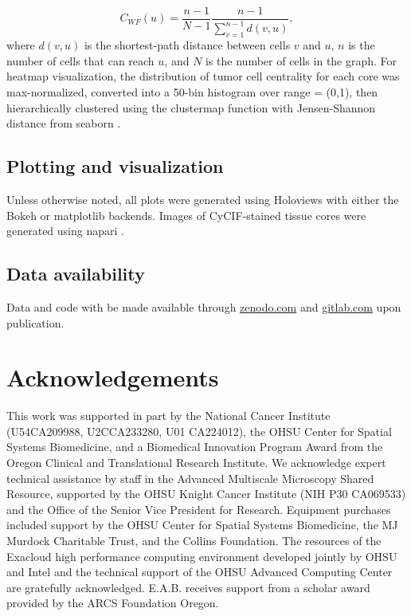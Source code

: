 \documentclass[preprint,review,3p,12pt]{elsarticle}
\begin{document}
\begin{equation}
\label{eq:cc}
C_{WF}(u) = \frac{n-1}{N-1} \frac{n - 1}{\sum_{v=1}^{n-1} d(v, u)},
\end{equation}
where $d(v,u)$ is the shortest-path distance between cells $v$ and $u$, $n$ is the number of cells that can reach $u$, and $N$ is the number of cells in the graph. For heatmap visualization, the distribution of tumor cell centrality for each core was max-normalized, converted into a 50-bin histogram over range = (0,1), then hierarchically clustered using the clustermap function with Jensen-Shannon distance from seaborn \cite{seaborn2020}.

\subsection{Plotting and visualization}
Unless otherwise noted, all plots were generated using Holoviews \cite{holoviews1_12_7} with either the Bokeh \cite{bokeh2020} or matplotlib \cite{mpl2007} backends. Images of CyCIF-stained tissue cores were generated using napari \cite{napari_0_3_0}.

\subsection{Data availability}
Data and code with be made available through \url{zenodo.com} and \url{gitlab.com} upon publication.

\section{Acknowledgements}
This work was supported in part by the National Cancer Institute (U54CA209988, U2CCA233280, U01 CA224012), the OHSU Center for Spatial Systems Biomedicine, and a Biomedical Innovation Program Award from the Oregon Clinical and Translational Research Institute. We acknowledge expert technical assistance by staff in the Advanced Multiscale Microscopy Shared Resource, supported by the OHSU Knight Cancer Institute (NIH P30 CA069533) and the Office of the Senior Vice President for Research. Equipment purchases included support by the OHSU Center for Spatial Systems Biomedicine, the MJ Murdock Charitable Trust, and the Collins Foundation. The resources of the Exacloud high performance computing environment developed jointly by OHSU and Intel and the technical support of the OHSU Advanced Computing Center are gratefully acknowledged. E.A.B. receives support from a scholar award provided by the ARCS Foundation Oregon.
\end{document}
